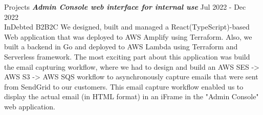 \begin{section}{Projects}
    {\sl \textbf{Admin Console web interface for internal use}} \hfill Jul 2022 - Dec 2022 \\ InDebted \hfill B2B2C
    We designed, built and managed a React(TypeScript)-based Web application that was deployed to AWS Amplify using Terraform. Also, we built a backend in Go and deployed to AWS Lambda using Terraform and Serverless framework. The most exciting part about this application was build the email capturing workflow, where we had to design and build an AWS SES -> AWS S3 -> AWS SQS workflow to asynchronously capture emails that were sent from SendGrid to our customers. This email capture workflow enabled us to display the actual email (in HTML format) in an iFrame in the "Admin Console" web application.
    
  \end{section}
  